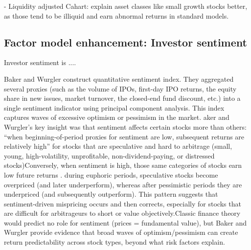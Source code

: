 - Liquidity adjusted Cahart: explain asset classes like small growth stocks better, as those tend to be illiquid and earn abnormal returns in standard models.

\subsection{Factor model enhancement: Investor sentiment}

Investor sentiment is ....

Baker and Wurgler construct quantitative sentiment index. They aggregated several proxies (such as the volume of IPOs, first-day IPO returns, the equity share in new issues, market turnover, the closed-end fund discount, etc.) into a single sentiment indicator using principal component analysis. This index captures waves of excessive optimism or pessimism in the market. aker and Wurgler’s key insight was that sentiment affects certain stocks more than others: “when beginning-of-period proxies for sentiment are low, subsequent returns are relatively high” for stocks that are speculative and hard to arbitrage (small, young, high-volatility, unprofitable, non-dividend-paying, or distressed stocks)Conversely, when sentiment is high, those same categories of stocks earn low future returns . during euphoric periods, speculative stocks become overpriced (and later underperform), whereas after pessimistic periods they are underpriced (and subsequently outperform). This pattern suggests that sentiment-driven mispricing occurs and then corrects, especially for stocks that are difficult for arbitrageurs to short or value objectively.Classic finance theory would predict no role for sentiment (prices = fundamental value), but Baker and Wurgler provide evidence that broad waves of optimism/pessimism can create return predictability across stock types, beyond what risk factors explain.



